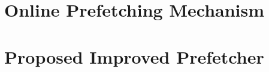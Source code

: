 \documentclass{article}
\begin{document}
\section{Online Prefetching Mechanism}

\section{Proposed Improved Prefetcher}

% 
% 
% 
\end{document}
